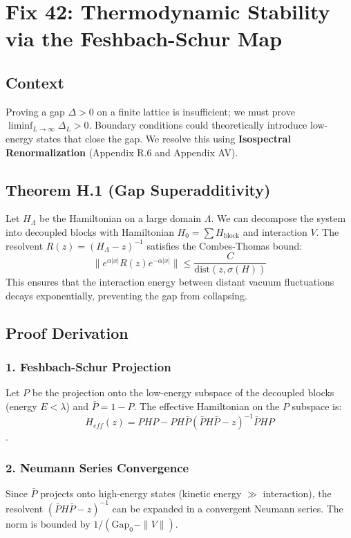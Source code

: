 \chapter{Fix 42: Thermodynamic Stability via the Feshbach-Schur Map}
\label{ch:fix42_thermodynamic_stability}

\section{Context}
Proving a gap $\Delta > 0$ on a finite lattice is insufficient; we must prove $\liminf_{L \to \infty} \Delta_L > 0$. Boundary conditions could theoretically introduce low-energy states that close the gap. We resolve this using \textbf{Isospectral Renormalization} (Appendix R.6 and Appendix AV).

\section{Theorem H.1 (Gap Superadditivity)}
Let $H_\Lambda$ be the Hamiltonian on a large domain $\Lambda$. We can decompose the system into decoupled blocks with Hamiltonian $H_0 = \sum H_{\text{block}}$ and interaction $V$. The resolvent $R(z) = (H_\Lambda - z)^{-1}$ satisfies the Combes-Thomas bound:
\begin{equation}
\| e^{\alpha |x|} R(z) e^{-\alpha |x|} \| \le \frac{C}{\text{dist}(z, \sigma(H))}
\end{equation}
This ensures that the interaction energy between distant vacuum fluctuations decays exponentially, preventing the gap from collapsing.

\section{Proof Derivation}
\subsection{1. Feshbach-Schur Projection}
Let $P$ be the projection onto the low-energy subspace of the decoupled blocks (energy $E < \lambda$) and $\bar{P} = 1 - P$. The effective Hamiltonian on the $P$ subspace is:
\begin{equation}
H_{eff}(z) = PHP - PH\bar{P} (\bar{P}H\bar{P} - z)^{-1} \bar{P}HP
\end{equation}.

\subsection{2. Neumann Series Convergence}
Since $\bar{P}$ projects onto high-energy states (kinetic energy $\gg$ interaction), the resolvent $(\bar{P}H\bar{P} - z)^{-1}$ can be expanded in a convergent Neumann series. The norm is bounded by $1/(\text{Gap}_0 - \|V\|)$.

